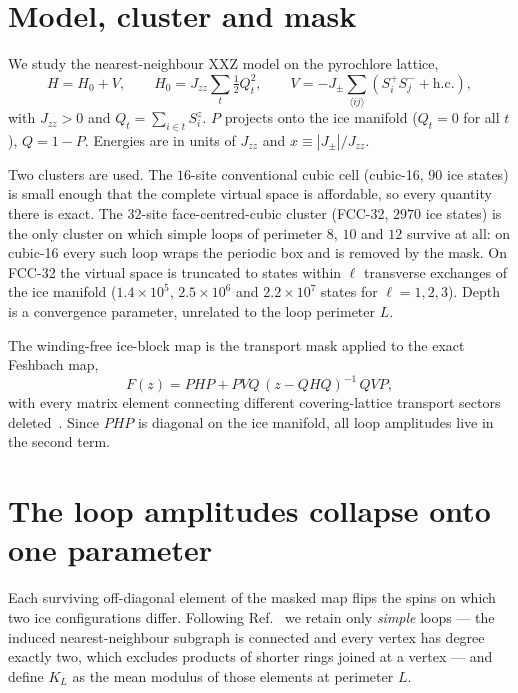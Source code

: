 \documentclass[aps,prb,preprint,amsmath,amssymb,superscriptaddress,
longbibliography,floatfix]{revtex4-2}
\newcommand{\Jzz}{J_{zz}}
\newcommand{\Jpm}{J_{\pm}}
\begin{document}
\section{Model, cluster and mask}
\label{sec:model}

We study the nearest-neighbour XXZ model on the pyrochlore lattice,
\begin{equation}
 H=H_0+V,\qquad
 H_0=\Jzz\sum_t\tfrac12 Q_t^2,\qquad
 V=-\Jpm\!\!\sum_{\langle ij\rangle}\!\left(S_i^+S_j^-+\mathrm{h.c.}\right),
 \label{eq:model}
\end{equation}
with $\Jzz>0$ and $Q_t=\sum_{i\in t}S_i^z$.  $P$ projects onto the ice manifold
($Q_t=0$ for all $t$), $Q=1-P$.  Energies are in units of $\Jzz$ and
$x\equiv|\Jpm|/\Jzz$.

Two clusters are used.  The $16$-site conventional cubic cell (cubic-16, $90$
ice states) is small enough that the complete virtual space is affordable, so
every quantity there is exact.  The $32$-site face-centred-cubic cluster
(FCC-32, $2970$ ice states) is the only cluster on which simple loops of
perimeter $8$, $10$ and $12$ survive at all: on cubic-16 every such loop wraps
the periodic box and is removed by the mask.  On FCC-32 the virtual space is
truncated to states within $\ell$ transverse exchanges of the ice manifold
($1.4\times10^5$, $2.5\times10^6$ and $2.2\times10^7$ states for
$\ell=1,2,3$).  Depth is a convergence parameter, unrelated to the loop
perimeter $L$.

The winding-free ice-block map is the transport mask applied to the exact
Feshbach map,
\begin{equation}
 F(z)=PHP+PVQ\,(z-QHQ)^{-1}\,QVP ,
 \label{eq:feshbach}
\end{equation}
with every matrix element connecting different covering-lattice transport
sectors deleted~\cite{ZhouKimMask}.  Since $PHP$ is diagonal on the ice
manifold, all loop amplitudes live in the second term.

\section{The loop amplitudes collapse onto one parameter}
\label{sec:collapse}

Each surviving off-diagonal element of the masked map flips the spins on which
two ice configurations differ.  Following Ref.~\cite{ZhouKimMask} we retain
only \emph{simple} loops --- the induced nearest-neighbour subgraph is
connected and every vertex has degree exactly two, which excludes products of
shorter rings joined at a vertex --- and define $K_L$ as the mean modulus of
those elements at perimeter $L$.
\end{document}
